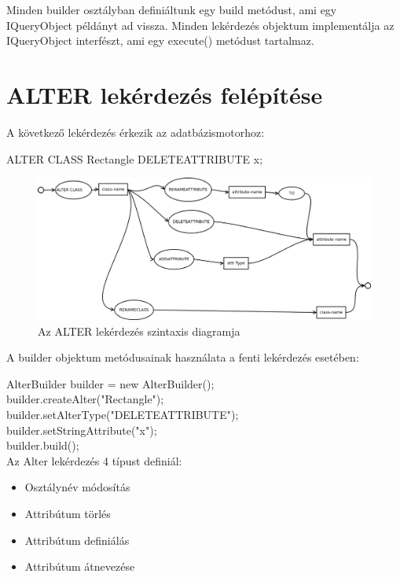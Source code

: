 Minden builder osztályban definiáltunk egy build metódust, ami egy IQueryObject példányt ad vissza. Minden lekérdezés objektum implementálja az IQueryObject interfészt, ami egy execute() metódust tartalmaz.



\section{ALTER lekérdezés felépítése}

A következő lekérdezés érkezik az adatbázismotorhoz:
\begin{sql}
ALTER CLASS Rectangle DELETEATTRIBUTE x;
\end{sql}


\begin{figure}[htb]
	\begin{center}
		\includegraphics[scale=0.4]{images/alter}
		\caption{Az ALTER lekérdezés szintaxis diagramja}
		\label{fig:alterSytnax}
	\end{center}
\end{figure}

A builder objektum metódusainak használata a fenti lekérdezés esetében:

AlterBuilder builder = new AlterBuilder(); \\
builder.createAlter("Rectangle"); \\
builder.setAlterType("DELETEATTRIBUTE"); \\
builder.setStringAttribute("x"); \\
builder.build(); \\

Az Alter lekérdezés 4 típust definiál:

\begin{itemize}
\item Osztálynév módosítás
\item Attribútum törlés
\item Attribútum definiálás
\item Attribútum átnevezése
\end{itemize}

